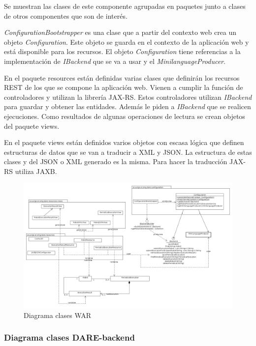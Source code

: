 Se muestran las clases de este componente agrupadas en paquetes junto
a clases de otros componentes que son de interés.

\emph{ConfigurationBootstrapper} es una clase que a partir del
contexto web crea un objeto \emph{Configuration}. Este objeto se
guarda en el contexto de la aplicación web y está disponible para los
recursos. El objeto \emph{Configuration} tiene referencias a la
implementación de \emph{IBackend} que se va a usar y el
\emph{MinilanguageProducer}.

En el paquete resources están definidas varias clases que definirán
los recursos REST de los que se compone la aplicación web. Vienen a
cumplir la función de controladores y utilizan la librería
JAX-RS. Estos controladores utilizan \emph{IBackend} para guardar y
obtener las entidades. Además le piden a \emph{IBackend} que se
realicen ejecuciones. Como resultados de algunas operaciones de
lectura se crean objetos del paquete views.

En el paquete views están definidos varios objetos con escasa lógica
que definen estructuras de datos que se van a traducir a XML y
JSON. La estructura de estas clases y del JSON o XML generado es la
misma. Para hacer la traducción JAX-RS utiliza JAXB\cite{JAXB}.

\begin{landscape}
\begin{figure}[hp]
\includegraphics[width=1.4\textwidth]{chapters/technical-manual/diagrams/clases_war.png}
\caption{Diagrama clases WAR}\label{diagrama_clases_war}
\end{figure}
\end{landscape}

\subsubsection{Diagrama clases DARE-backend}
